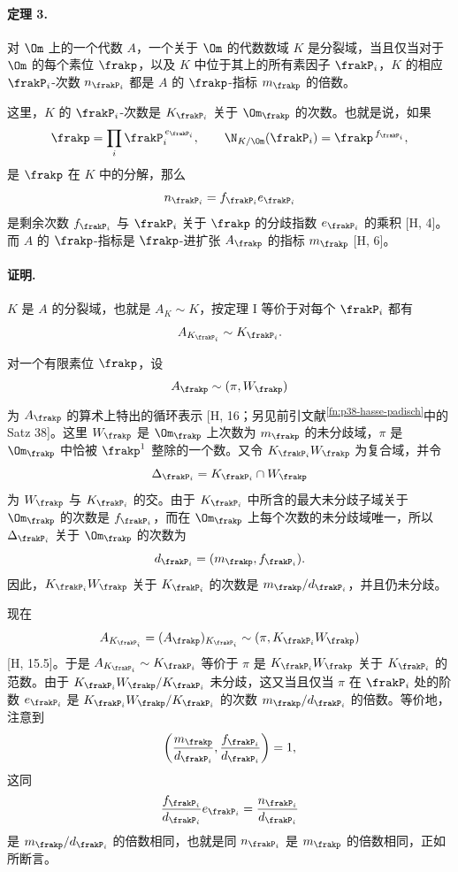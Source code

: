 \paragraph{定理 3.}
对 \(\Om\) 上的一个代数 \(A\)，一个关于 \(\Om\) 的代数数域 \(K\) 是分裂域，当且仅当对于 \(\Om\) 的每个素位 \(\frakp\)，以及 \(K\) 中位于其上的所有素因子 \(\frakP_i\)，\(K\) 的相应 \(\frakP_i\)-次数 \(n_{\frakP_i}\) 都是 \(A\) 的 \(\frakp\)-指标 \(m_{\frakp}\) 的倍数。

这里，\(K\) 的 \(\frakP_i\)-次数是 \(K_{\frakP_i}\) 关于 \(\Om_{\frakp}\) 的次数。也就是说，如果
\[
\frakp=\prod_i \frakP_i^{\,e_{\frakP_i}},
        \qquad \N_{K/\Om}(\frakP_i)=\frakp^{\,f_{\frakP_i}},
\]
是 \(\frakp\) 在 \(K\) 中的分解，那么
\[
n_{\frakP_i}=f_{\frakP_i}e_{\frakP_i}
\]
是剩余次数 \(f_{\frakP_i}\) 与 \(\frakP_i\) 关于 \(\frakp\) 的分歧指数 \(e_{\frakP_i}\) 的乘积 [H, 4]。而 \(A\) 的 \(\frakp\)-指标是 \(\frakp\)-进扩张 \(A_{\frakp}\) 的指标 \(m_{\frakp}\) [H, 6]。

\paragraph{证明.}
\(K\) 是 \(A\) 的分裂域，也就是 \(A_K\sim K\)，按定理 I 等价于对每个 \(\frakP_i\) 都有
\[
A_{K_{\frakP_i}}\sim K_{\frakP_i}.
\]

对一个有限素位 \(\frakp\)，设
\[
        A_{\frakp}\sim(\pi,W_{\frakp})
\]
为 \(A_{\frakp}\) 的算术上特出的循环表示 [H, 16；另见前引文献\textsuperscript{\ref{fn:p38-hasse-padisch}}中的 Satz 38]。这里 \(W_{\frakp}\) 是 \(\Om_{\frakp}\) 上次数为 \(m_{\frakp}\) 的未分歧域，\(\pi\) 是 \(\Om_{\frakp}\) 中恰被 \(\frakp^1\) 整除的一个数。又令 \(K_{\frakP_i}W_{\frakp}\) 为复合域，并令
\[
        \Delta_{\frakP_i}=K_{\frakP_i}\cap W_{\frakp}
\]
为 \(W_{\frakp}\) 与 \(K_{\frakP_i}\) 的交。由于 \(K_{\frakP_i}\) 中所含的最大未分歧子域关于 \(\Om_{\frakp}\) 的次数是 \(f_{\frakP_i}\)，而在 \(\Om_{\frakp}\) 上每个次数的未分歧域唯一，所以 \(\Delta_{\frakP_i}\) 关于 \(\Om_{\frakp}\) 的次数为
\[
        d_{\frakP_i}=(m_{\frakp},f_{\frakP_i}).
\]
因此，\(K_{\frakP_i}W_{\frakp}\) 关于 \(K_{\frakP_i}\) 的次数是 \(m_{\frakp}/d_{\frakP_i}\)，并且仍未分歧。

现在
\[
        A_{K_{\frakP_i}}=(A_{\frakp})_{K_{\frakP_i}}
        \sim(\pi,K_{\frakP_i}W_{\frakp})
\]
[H, 15.5]。于是 \(A_{K_{\frakP_i}}\sim K_{\frakP_i}\) 等价于 \(\pi\) 是 \(K_{\frakP_i}W_{\frakp}\) 关于 \(K_{\frakP_i}\) 的范数。由于 \(K_{\frakP_i}W_{\frakp}/K_{\frakP_i}\) 未分歧，这又当且仅当 \(\pi\) 在 \(\frakP_i\) 处的阶数 \(e_{\frakP_i}\) 是 \(K_{\frakP_i}W_{\frakp}/K_{\frakP_i}\) 的次数 \(m_{\frakp}/d_{\frakP_i}\) 的倍数。等价地，注意到
\[
\left(\frac{m_{\frakp}}{d_{\frakP_i}},\frac{f_{\frakP_i}}{d_{\frakP_i}}\right)=1,
\]
这同
\[
\frac{f_{\frakP_i}}{d_{\frakP_i}}e_{\frakP_i}
  =\frac{n_{\frakP_i}}{d_{\frakP_i}}
\]
是 \(m_{\frakp}/d_{\frakP_i}\) 的倍数相同，也就是同 \(n_{\frakP_i}\) 是 \(m_{\frakp}\) 的倍数相同，正如所断言。

